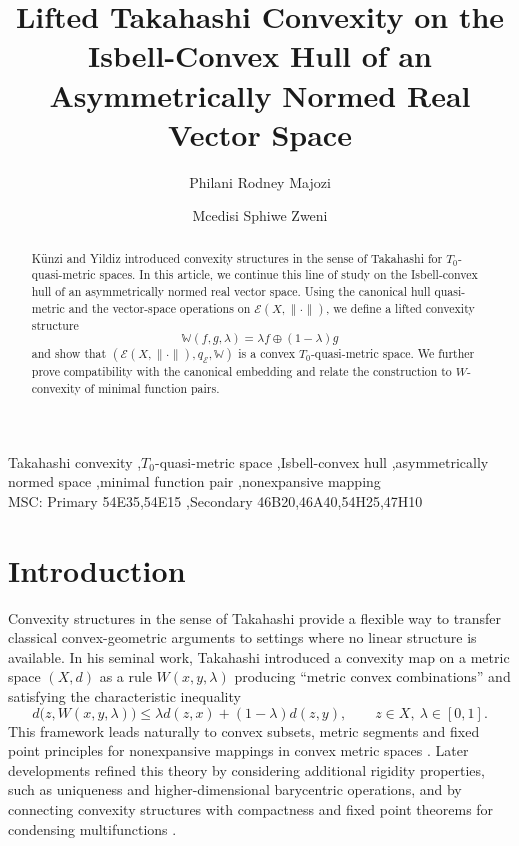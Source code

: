 \documentclass[preprint,12pt]{elsarticle}
\numberwithin{equation}{section}
\newcommand{\E}{\mathcal{E}}
\begin{document}
\begin{frontmatter}

\title{Lifted Takahashi Convexity on the Isbell-Convex Hull of an Asymmetrically Normed Real Vector Space}

\author{Philani Rodney Majozi}

\author{Mcedisi Sphiwe Zweni}

\address{School of Mathematical and Statistical Sciences, Pure and Applied Analytics, North-West University, Mahikeng Campus, South Africa}

\begin{abstract}
K\"unzi and Yildiz introduced convexity structures in the sense of Takahashi
for \(T_{0}\)-quasi-metric spaces. In this article, we continue this line of
study on the Isbell-convex hull of an asymmetrically normed real vector space.
Using the canonical hull quasi-metric and the vector-space operations on
\(\E(X,\|\cdot\|)\), we define a lifted convexity structure
\[
\mathbb W(f,g,\lambda)=\lambda f\oplus(1-\lambda)g
\]
and show that \((\E(X,\|\cdot\|),q_{\E},\mathbb W)\) is a convex
\(T_{0}\)-quasi-metric space. We further prove compatibility with the canonical
embedding and relate the construction to \(W\)-convexity of minimal function
pairs.
\end{abstract}

\begin{keyword}
Takahashi convexity \sep $T_{0}$-quasi-metric space \sep Isbell-convex hull
\sep asymmetrically normed space \sep minimal function pair \sep nonexpansive mapping
\\[2pt]
MSC: Primary 54E35\sep 54E15 \sep Secondary 46B20\sep 46A40\sep 54H25\sep 47H10
\end{keyword}

\end{frontmatter}

\section{Introduction}

Convexity structures in the sense of Takahashi provide a flexible way to
transfer classical convex-geometric arguments to settings where no linear
structure is available.  In his seminal work, Takahashi introduced a convexity
map on a metric space \((X,d)\) as a rule \(W(x,y,\lambda)\) producing
``metric convex combinations'' and satisfying the characteristic inequality
\[
d\bigl(z,W(x,y,\lambda)\bigr)
\le
\lambda d(z,x)+(1-\lambda)d(z,y),
\qquad z\in X,\ \lambda\in[0,1].
\]
This framework leads naturally to convex subsets, metric segments and fixed
point principles for nonexpansive mappings in convex metric spaces
\cite{Takahashi1970}.  Later developments refined this theory by considering
additional rigidity properties, such as uniqueness and higher-dimensional
barycentric operations, and by connecting convexity structures with compactness
and fixed point theorems for condensing multifunctions \cite{Talman1977}.
\end{document}

